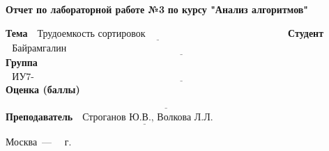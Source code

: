 \begin{titlepage}
    \begin{center}
        \Large\textbf{Отчет по лабораторной работе №3}
        \Large\textbf{по курсу "Анализ алгоритмов"}\newline
    \end{center}

    \noindent\textbf{Тема} $\underline{\text{~~Трудоемкость сортировок~~~~~~~~~~~~~~~~~~~~~~~~~~~~~~~~~~~~~~~~~~~}}$\newline\newline\newline
    \noindent\textbf{Студент} $\underline{\text{~~Байрамгалин Я.Р.~~~~~~~~~~~~~~~~~~~~~~~~~~~~~~~~~~~~~~~~~~~~~~~~~~~~~~~~~~~~~~~~~~~~~~~~~~~~~~~~~~~~}}$\newline\newline
    \noindent\textbf{Группа} $\underline{\text{~~ИУ7-53Б~~~~~~~~~~~~~~~~~~~~~~~~~~~~~~~~~~~~~~~~~~~~~~~~~~~~~~~~~~~~~~~~~~~~~~~~~~~~~~~~~~~~~~~~~~~~~~~~~~}}$\newline\newline
    \noindent\textbf{Оценка (баллы)} $\underline{\text{~~~~~~~~~~~~~~~~~~~~~~~~~~~~~~~~~~~~~~~~~~~~~~~~~~~~~~~~~~~~~~~~~~~~~~~~~~~~~~~~~~~~~~~~~~~~~~~~~~~}}$\newline\newline
    \noindent\textbf{Преподаватель} $\underline{\text{~~Строганов Ю.В., Волкова Л.Л.}}$\newline

    \begin{center}
        \vfill
        Москва~---~\the\year
        ~г.
    \end{center}
    \restoregeometry
\end{titlepage}
